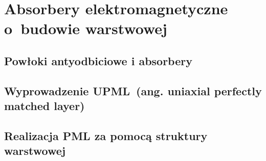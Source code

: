 \chapter{\mbox{Absorbery} \mbox{elektromagnetyczne} \mbox{o~budowie} \mbox{warstwowej}}
\label{roz:pml}

\section{Powłoki antyodbiciowe i absorbery}

\section{Wyprowadzenie UPML~(ang. uniaxial perfectly matched layer)}

\section{Realizacja PML za pomocą struktury warstwowej}

